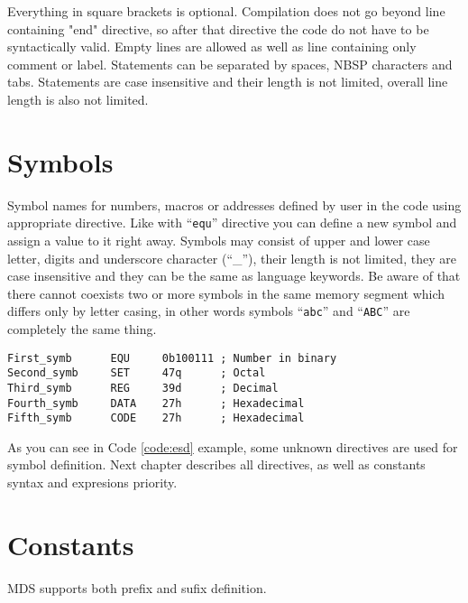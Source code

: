    Everything in square brackets is optional. Compilation does not go beyond line containing "end" directive, so after that directive the code do not have to be syntactically valid. Empty lines are allowed as well as line containing only comment or label. Statements can be separated by spaces, NBSP characters and tabs. Statements are case insensitive and their length is not limited, overall line length is also not limited.

\section{Symbols}
    Symbol names for numbers, macros or addresses defined by user in the code using appropriate directive. Like with ``\texttt{equ}'' directive you can define a new symbol and assign a value to it right away. Symbols may consist of upper and lower case letter, digits and underscore character (``\_''), their length is not limited, they are case insensitive and they can be the same as language keywords. Be aware of that there cannot coexists two or more symbols in the same memory segment which differs only by letter casing, in other words symbols ``\texttt{abc}'' and ``\texttt{ABC}'' are completely the same thing.

    {
        \usecodefont
        \verb'First_symb      EQU     0b100111 ; Number in binary'\\
        \verb'Second_symb     SET     47q      ; Octal'\\
        \verb'Third_symb      REG     39d      ; Decimal'\\
        \verb'Fourth_symb     DATA    27h      ; Hexadecimal'\\
        \verb'Fifth_symb      CODE    27h      ; Hexadecimal'

    }

    As you can see in Code \ref{code:esd} example, some unknown directives are used for symbol definition. Next chapter describes all directives, as well as constants syntax and expresions priority.

\section{Constants}
    MDS supports both prefix and sufix definition.

